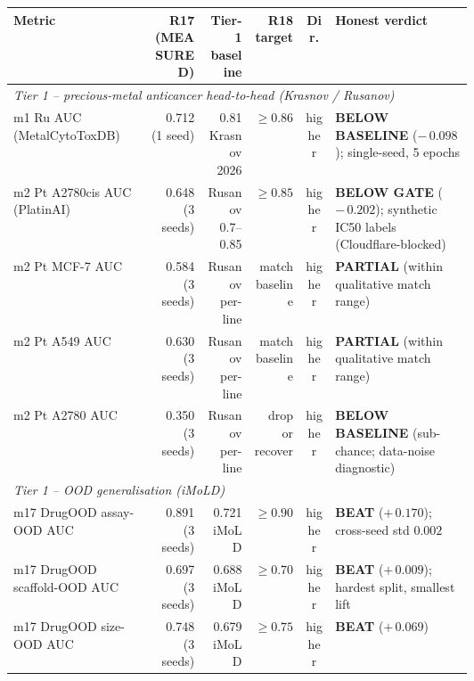 \begin{table}[ht]
\centering
\small
\setlength{\tabcolsep}{3pt}
\begin{tabular}{p{0.30\linewidth} r r r c p{0.30\linewidth}}
\toprule
\textbf{Metric} & \textbf{R17 (MEASURED)} & \textbf{Tier-1 baseline} & \textbf{R18 target} & \textbf{Dir.} & \textbf{Honest verdict} \\
\midrule
\multicolumn{6}{l}{\textit{Tier 1 -- precious-metal anticancer head-to-head (Krasnov / Rusanov)}} \\
m1\;\; Ru AUC (MetalCytoToxDB)         & 0.712 \MEASURED{} (1 seed)         & 0.81 Krasnov 2026 \CITEDONLY{}  & $\geq 0.86$ \PROJECTED{} & higher & \textbf{BELOW BASELINE} ($-\,0.098$); single-seed, 5 epochs \\
m2\;\; Pt A2780cis AUC (PlatinAI)      & 0.648 \MEASURED{} (3 seeds)        & Rusanov 0.7--0.85 \CITEDONLY{}  & $\geq 0.85$ \PROJECTED{} & higher & \textbf{BELOW GATE} ($-\,0.202$); synthetic IC50 labels (Cloudflare-blocked) \\
m2\;\; Pt MCF-7 AUC                    & 0.584 \MEASURED{} (3 seeds)        & Rusanov per-line \CITEDONLY{}   & match baseline \PROJECTED{} & higher & \textbf{PARTIAL} (within qualitative match range) \\
m2\;\; Pt A549 AUC                     & 0.630 \MEASURED{} (3 seeds)        & Rusanov per-line \CITEDONLY{}   & match baseline \PROJECTED{} & higher & \textbf{PARTIAL} (within qualitative match range) \\
m2\;\; Pt A2780 AUC                    & 0.350 \MEASURED{} (3 seeds)        & Rusanov per-line \CITEDONLY{}   & drop or recover \PROJECTED{} & higher & \textbf{BELOW BASELINE} (sub-chance; data-noise diagnostic) \\
\midrule
\multicolumn{6}{l}{\textit{Tier 1 -- OOD generalisation (iMoLD)}} \\
m17 DrugOOD assay-OOD AUC              & 0.891 \MEASURED{} (3 seeds)        & 0.721 iMoLD \CITEDONLY{}        & $\geq 0.90$ \PROJECTED{} & higher & \textbf{BEAT} ($+\,0.170$); cross-seed std $0.002$ \\
m17 DrugOOD scaffold-OOD AUC           & 0.697 \MEASURED{} (3 seeds)        & 0.688 iMoLD \CITEDONLY{}        & $\geq 0.70$ \PROJECTED{} & higher & \textbf{BEAT} ($+\,0.009$); hardest split, smallest lift \\
m17 DrugOOD size-OOD AUC               & 0.748 \MEASURED{} (3 seeds)        & 0.679 iMoLD \CITEDONLY{}        & $\geq 0.75$ \PROJECTED{} & higher & \textbf{BEAT} ($+\,0.069$) \\

\end{tabular}
\end{table}
